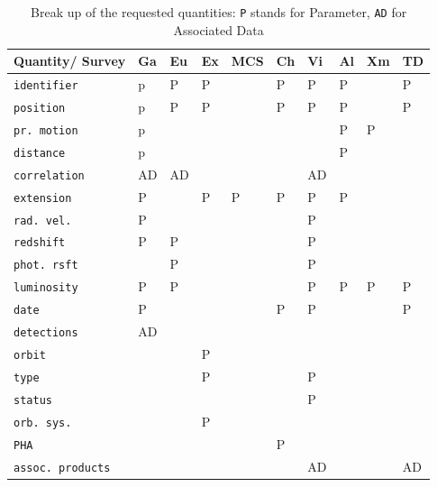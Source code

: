 \documentclass[11pt,a4paper]{ivoa}
\begin{document}
\begin{table}[ht!]
     \tiny
     \begin{tabular}{|p{2.4cm}|p{0.4cm}|p{0.4cm}|p{0.4cm}|p{0.6cm}|p{0.4cm}|p{0.4cm}|p{0.4cm}|p{0.4cm}|p{0.4cm}|}
       \hline Quantity/ Survey &  Ga &  Eu &  Ex &  MCS  &  Ch&  Vi &  Al &  Xm&  TD \\
       \hline  \texttt{identifier}      &  p & P  &P& &P&P &P&  & P \\
       \hline  \texttt{position}      &  p & P  &P& &P&P &P&  & P \\
       \hline  \texttt{pr. motion}   & p &   &   &    &  &   &P&P&    \\
       \hline  \texttt{distance}     & p &   &   &    &  &   &P&  &    \\
       \hline  \texttt{correlation}   & AD &AD&   &    &  &AD &   &  &    \\
       \hline  \texttt{extension}     &P&   &P&P &P&P& P&  &    \\
       \hline  \texttt{rad. vel.}       &  P &   &   &    &  &P&   &  &    \\
       \hline  \texttt{redshift}        &  P &P&   &    &  &P&   &  &    \\
       \hline  \texttt{phot. rsft}      &   &P&   &    &  &P&   &  &    \\
       \hline  \texttt{luminosity}    & P&P&   &    &  &P&P&P&P\\
       \hline  \texttt{date}             & P  &   &   &    & P&P&   &  &P\\
       \hline  \texttt{detections}    &  AD &   &   &    &  &   &   &  &    \\
       \hline  \texttt{orbit}             &   &   &P& &  &   &   &  &    \\
       \hline  \texttt{type}             &   &   & P& &  &P&   &  &    \\
       \hline  \texttt{status}          &   &   &   &    &  &P&   &  &    \\
       \hline  \texttt{orb. sys.}      &   &   &  P &    &  &   &   &  &    \\
       \hline  \texttt{PHA}            &   &   &   &    &P&   &   &  &    \\
       \hline  \texttt{assoc. products}     &   &   &   &    &  &AD&   &  &AD \\
       \hline
     \end{tabular}
     \caption{ Break up of the requested quantities:  \texttt{P} stands for Parameter, \texttt{AD} for Associated Data}

     \label{tab:q_breakup}
 \end{table}
\end{document}
